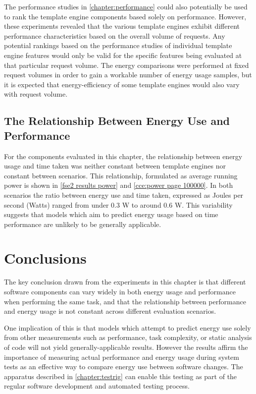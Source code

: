 The performance studies in \autoref{chapter:performance} could also potentially be used to rank the \gls{template engine} components based solely on performance. However, these experiments revealed that the various \gls{template engine}s exhibit different performance characteristics based on the overall volume of requests. Any potential rankings based on the performance studies of individual \gls{template engine} features would only be valid for the specific features being evaluated at that particular request volume. The energy comparisons were performed at fixed request volumes in order to gain a workable number of energy usage samples, but it is expected that energy-efficiency of some \gls{template engine}s would also vary with request volume.

\subsection{The Relationship Between Energy Use and Performance}
\label{ce relationship}

For the components evaluated in this chapter, the relationship between energy usage and time taken was neither constant between \gls{template engine}s nor constant between scenarios. This relationship, formulated as average running power is shown in \autoref{fse2 results power} and \autoref{cce:power page 100000}. In both scenarios the ratio between energy use and time taken, expressed as Joules per second (Watts) ranged from under 0.3 W to around 0.6 W. This variability suggests that models which aim to predict energy usage based on time performance are unlikely to be generally applicable.

\section{Conclusions}
\label{ce conclusions}

The key conclusion drawn from the experiments in this chapter is that different software components can vary widely in both energy usage and performance when performing the same task, and that the relationship between performance and energy usage is not constant across different evaluation scenarios. 

One implication of this is that models which attempt to predict energy use solely from other measurements such as performance, task complexity, or static analysis of code will not yield generally-applicable results. However the results affirm the importance of measuring actual performance and energy usage during system tests as an effective way to compare energy use between software changes. The apparatus described in \autoref{chapter:testrig} can enable this testing as part of the regular software development and automated testing process.

